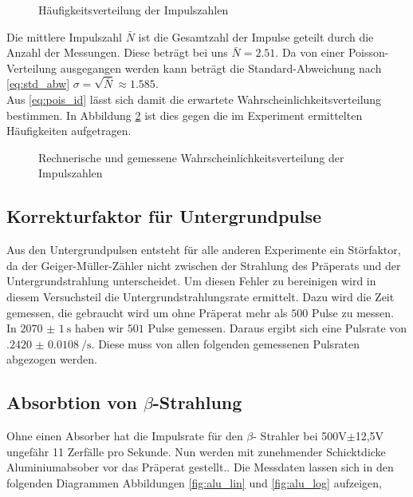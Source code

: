 \begin{figure}[h!]
	\centering
	
	\caption{Häufigkeitsverteilung der Impulszahlen}
	\label{fig:haeuf_hint_1}
\end{figure}

Die mittlere Impulszahl $ \bar N $ ist die Gesamtzahl der Impulse geteilt durch die Anzahl der Messungen. Diese beträgt bei uns $ \bar N = \num{2.51} $. Da von einer Poisson-Verteilung ausgegangen werden kann beträgt die Standard-Abweichung nach \eqref{eq:std_abw} $ \sigma = \sqrt{\bar N} \approx \num{1.585} $.\\
Aus \eqref{eq:pois_id} lässt sich damit die erwartete Wahrscheinlichkeitsverteilung bestimmen. In Abbildung \ref{fig:a2_rech} ist dies gegen die im Experiment ermittelten Häufigkeiten aufgetragen.

\begin{figure}[h!]
\centering

\caption{Rechnerische und gemessene Wahrscheinlichkeitsverteilung der Impulszahlen}
\label{fig:a2_rech}
\end{figure}

\subsection{Korrekturfaktor für Untergrundpulse}
Aus den Untergrundpulsen entsteht für alle anderen Experimente ein Störfaktor, da der Geiger-Müller-Zähler nicht zwischen der Strahlung des Präperats und der Untergrundstrahlung unterscheidet. Um diesen Fehler zu bereinigen wird in diesem Versuchsteil die Untergrundstrahlungsrate ermittelt. Dazu wird die Zeit gemessen, die gebraucht wird um ohne Präperat mehr als $ 500 $ Pulse zu messen.\\
In $ \SI{2070(1)}{\second} $ haben wir $ 501 $ Pulse gemessen. Daraus ergibt sich eine Pulsrate von $ \SI{.2420(108)}{\per\second} $. Diese muss von allen folgenden gemessenen Pulsraten abgezogen werden.

\subsection{Absorbtion von $ \beta $-Strahlung}

Ohne einen Absorber hat die Impulsrate für den $\beta$- Strahler
bei 500V$\pm$12,5V ungefähr 11 Zerfälle pro Sekunde. Nun werden mit
zunehmender Schicktdicke Aluminiumabsober vor das Präperat gestellt..
Die Messdaten lassen sich in den folgenden Diagrammen Abbildungen \ref{fig:alu_lin} und \ref{fig:alu_log} aufzeigen,

